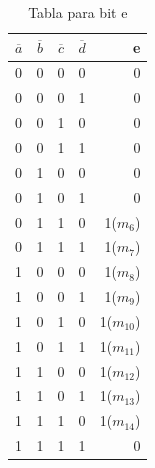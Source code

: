 \begin{table}[H]
	\begin{center}
		\caption{Tabla para bit e}
		\vspace{5mm}
		\begin{tabular}{l|c|c|c|r}
			\textbf{$\overline{a}$} & \textbf{$\overline{b}$} & \textbf{$\overline{c}$} & \textbf{$\overline{d}$} & \textbf{e}  \\
			\hline
			0                       & 0                       & 0                       & 0                       & 0           \\
			0                       & 0                       & 0                       & 1                       & 0           \\	
			0                       & 0                       & 1                       & 0                       & 0           \\
			0                       & 0                       & 1                       & 1                       & 0           \\
			0                       & 1                       & 0                       & 0                       & 0           \\
			0                       & 1                       & 0                       & 1                       & 0           \\	
			0                       & 1                       & 1                       & 0                       & 1($m_{6}$)  \\
			0                       & 1                       & 1                       & 1                       & 1($m_{7}$)  \\		
			1                       & 0                       & 0                       & 0                       & 1($m_{8}$)  \\
			1                       & 0                       & 0                       & 1                       & 1($m_{9}$)  \\	
			1                       & 0                       & 1                       & 0                       & 1($m_{10}$) \\
			1                       & 0                       & 1                       & 1                       & 1($m_{11}$) \\
			1                       & 1                       & 0                       & 0                       & 1($m_{12}$) \\
			1                       & 1                       & 0                       & 1                       & 1($m_{13}$) \\	
			1                       & 1                       & 1                       & 0                       & 1($m_{14}$) \\
			1                       & 1                       & 1                       & 1                       & 0           \\			
		\end{tabular}
	\end{center}
\end{table}
